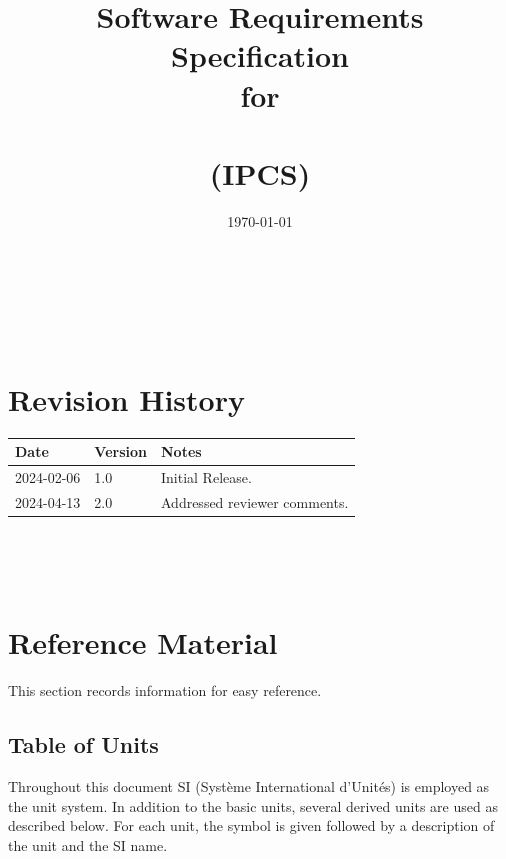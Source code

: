 \documentclass[12pt]{article}
\begin{document}
\title{Software Requirements Specification \\ for \\ \progname \\ (IPCS)} 
\author{\authname}
\date{\today}
	
\maketitle

~\newpage


\tableofcontents

~\newpage

\section*{Revision History}

\begin{tabularx}{\textwidth}{p{3cm}p{2cm}X}
\toprule {\bf Date} & {\bf Version} & {\bf Notes}\\
\midrule
2024-02-06 & 1.0 & Initial Release.\\
2024-04-13 & 2.0 & Addressed reviewer comments.\\
\bottomrule
\end{tabularx}

~\\

~\newpage

\section{Reference Material}

This section records information for easy reference.

\subsection{Table of Units}

Throughout this document SI (Syst\`{e}me International d'Unit\'{e}s) is employed
as the unit system.  In addition to the basic units, several derived units are
used as described below.  For each unit, the symbol is given followed by a
description of the unit and the SI name.
~\newline
\end{document}
